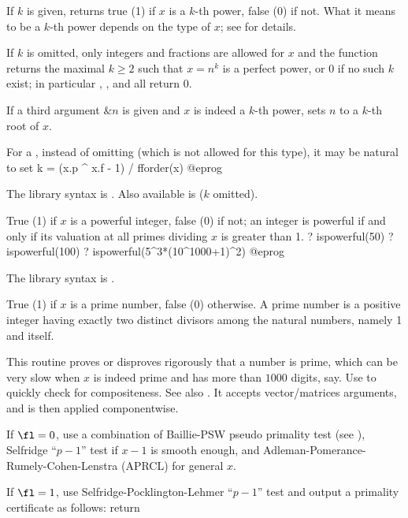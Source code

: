 \label{se:ispower}
If $k$ is given, returns true (1) if $x$ is a $k$-th power, false
(0) if not. What it means to be a $k$-th power depends on the type of
$x$; see  for details.

If $k$ is omitted, only integers and fractions are allowed for $x$ and the
function returns the maximal $k \geq 2$ such that $x = n^k$ is a perfect
power, or 0 if no such $k$ exist; in particular ,
, and  all return $0$.

If a third argument $\&n$ is given and $x$ is indeed a $k$-th power, sets
$n$ to a $k$-th root of $x$.

\noindent For a  , instead of omitting  (which is
not allowed for this type), it may be natural to set
\bprog
k = (x.p ^ x.f - 1) / fforder(x)
@eprog

The library syntax is .
Also available is
 ($k$ omitted).

\label{se:ispowerful}
True (1) if $x$ is a powerful integer, false (0) if not;
an integer is powerful if and only if its valuation at all primes dividing
$x$ is greater than 1.
\bprog
? ispowerful(50)
? ispowerful(100)
? ispowerful(5^3*(10^1000+1)^2)
@eprog

The library syntax is .

\label{se:isprime}
True (1) if $x$ is a prime
number, false (0) otherwise. A prime number is a positive integer having
exactly two distinct divisors among the natural numbers, namely 1 and
itself.

This routine proves or disproves rigorously that a number is prime, which can
be very slow when $x$ is indeed prime and has more than $1000$ digits, say.
Use  to quickly check for compositeness. See also
. It accepts vector/matrices arguments, and is then applied
componentwise.

If $\fl=0$, use a combination of Baillie-PSW pseudo primality test (see
), Selfridge ``$p-1$'' test if $x-1$ is smooth enough, and
Adleman-Pomerance-Rumely-Cohen-Lenstra (APRCL) for general $x$.

If $\fl=1$, use Selfridge-Pocklington-Lehmer ``$p-1$'' test and output a
primality certificate as follows: return

